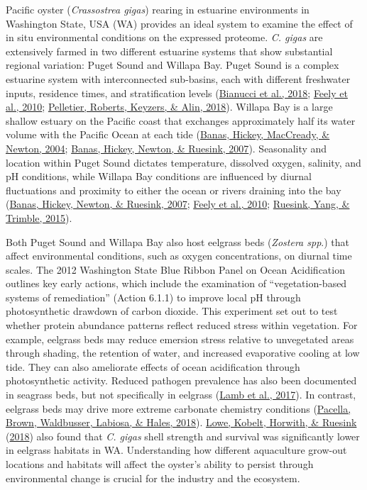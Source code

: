 \documentclass [11pt, proquest] {uwthesis}[2015/03/03]
\begin{document}
Pacific oyster (\emph{Crassostrea gigas}) rearing in estuarine environments in Washington State, USA (WA) provides an ideal system to examine the effect of in situ environmental conditions on the expressed proteome. \emph{C. gigas} are extensively farmed in two different estuarine systems that show substantial regional variation: Puget Sound and Willapa Bay. Puget Sound is a complex estuarine system with interconnected sub-basins, each with different freshwater inputs, residence times, and stratification levels (\protect\hyperlink{ref-Bianucci2018}{Bianucci et al., 2018}; \protect\hyperlink{ref-Feely2010}{Feely et al., 2010}; \protect\hyperlink{ref-Pelletier2018}{Pelletier, Roberts, Keyzers, \& Alin, 2018}). Willapa Bay is a large shallow estuary on the Pacific coast that exchanges approximately half its water volume with the Pacific Ocean at each tide (\protect\hyperlink{ref-Banas2004}{Banas, Hickey, MacCready, \& Newton, 2004}; \protect\hyperlink{ref-Banas2007}{Banas, Hickey, Newton, \& Ruesink, 2007}). Seasonality and location within Puget Sound dictates temperature, dissolved oxygen, salinity, and pH conditions, while Willapa Bay conditions are influenced by diurnal fluctuations and proximity to either the ocean or rivers draining into the bay (\protect\hyperlink{ref-Banas2007}{Banas, Hickey, Newton, \& Ruesink, 2007}; \protect\hyperlink{ref-Feely2010}{Feely et al., 2010}; \protect\hyperlink{ref-Ruesink2015}{Ruesink, Yang, \& Trimble, 2015}).

Both Puget Sound and Willapa Bay also host eelgrass beds (\emph{Zostera spp}.) that affect environmental conditions, such as oxygen concentrations, on diurnal time scales. The 2012 Washington State Blue Ribbon Panel on Ocean Acidification outlines key early actions, which include the examination of ``vegetation-based systems of remediation'' (Action 6.1.1) to improve local pH through photosynthetic drawdown of carbon dioxide. This experiment set out to test whether protein abundance patterns reflect reduced stress within vegetation. For example, eelgrass beds may reduce emersion stress relative to unvegetated areas through shading, the retention of water, and increased evaporative cooling at low tide. They can also ameliorate effects of ocean acidification through photosynthetic activity. Reduced pathogen prevalence has also been documented in seagrass beds, but not specifically in eelgrass (\protect\hyperlink{ref-Lamb2017}{Lamb et al., 2017}). In contrast, eelgrass beds may drive more extreme carbonate chemistry conditions (\protect\hyperlink{ref-Pacella2018}{Pacella, Brown, Waldbusser, Labiosa, \& Hales, 2018}). \protect\hyperlink{ref-Lowe2018}{Lowe, Kobelt, Horwith, \& Ruesink} (\protect\hyperlink{ref-Lowe2018}{2018}) also found that \emph{C. gigas} shell strength and survival was significantly lower in eelgrass habitats in WA. Understanding how different aquaculture grow-out locations and habitats will affect the oyster's ability to persist through environmental change is crucial for the industry and the ecosystem.
\end{document}
